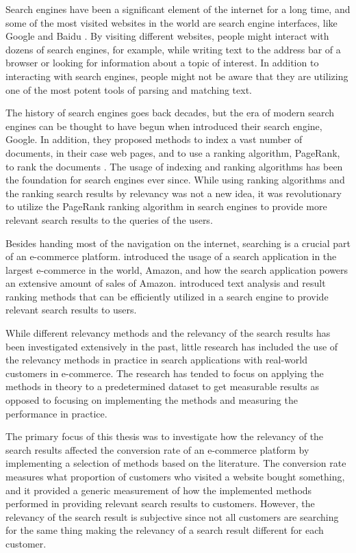 
Search engines have been a significant element of the internet for a long time, 
and some of the most visited websites in the world are search engine interfaces, 
like Google and Baidu \cite{alexa}.
By visiting different websites, people might interact with dozens of search engines, 
for example, while writing text to the address bar of a browser or looking for information about a topic of interest.
In addition to interacting with search engines, people might not be aware that they are utilizing one of the most 
potent tools of parsing and matching text.


The history of search engines goes back decades, but the era of modern search engines can be thought to have begun
when \citeauthor{googleInit} \cite{googleInit} introduced their search engine, Google. 
In addition, they proposed methods to index a vast number of documents, in their case web pages, 
and to use a ranking algorithm, PageRank, to rank the documents \cite{googleInit}. 
The usage of indexing and ranking algorithms has been the foundation for search engines ever since.
While using ranking algorithms and the ranking search results by relevancy was not a new idea, 
it was revolutionary to utilize the PageRank ranking algorithm in search engines to provide 
more relevant search results to the queries of the users.


Besides handing most of the navigation on the internet, 
searching is a crucial part of an e-commerce platform. 
\citeauthor{amazonJoyRanking} \cite{amazonJoyRanking} introduced the usage of a search application 
in the largest e-commerce in the world, Amazon, 
and how the search application powers an extensive amount of sales of Amazon.
\citeauthor{relevantSearch} \cite{relevantSearch} introduced text analysis and result ranking methods
that can be efficiently utilized in a search engine to provide relevant search results to users.


While different relevancy methods and the relevancy of the search results has been investigated extensively in the past, 
little research has included the use of the relevancy methods in practice in search applications 
with real-world customers in e-commerce. 
The research has tended to focus on applying the methods in theory to a predetermined dataset to get measurable results
as opposed to focusing on implementing the methods and measuring the performance in practice. 


The primary focus of this thesis was to investigate how the relevancy of the search results affected 
the conversion rate of an e-commerce platform by implementing a selection of methods based on the literature. 
The conversion rate measures what proportion of customers who visited a website bought something, 
and it provided a generic measurement of how the implemented methods performed in 
providing relevant search results to customers.
However, the relevancy of the search result is subjective 
since not all customers are searching for the same thing making the relevancy of a search result 
different for each customer.


